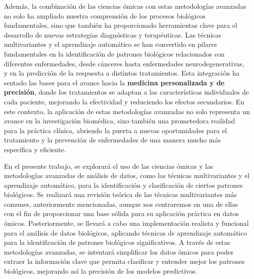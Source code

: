 Además, la combinación de las ciencias ómicas con estas metodologías avanzadas no solo ha ampliado nuestra comprensión
de los procesos biológicos fundamentales, sino que también ha proporcionado herramientas clave para el desarrollo de 
nuevas estrategias diagnósticas y terapéuticas. Las técnicas multivariantes y el aprendizaje 
automático se han convertido en pilares fundamentales en la identificación de patrones biológicos relacionados 
con diferentes enfermedades, desde cánceres hasta enfermedades neurodegenerativas, y en la predicción de la 
respuesta a distintos tratamientos. Esta integración ha sentado las bases para el avance hacia la 
\textbf{medicina personalizada y de precisión}, donde los tratamientos se adaptan a las características 
individuales de cada paciente, mejorando la efectividad y reduciendo los efectos secundarios. En este contexto, 
la aplicación de estas metodologías avanzadas no solo representa un avance en la investigación biomédica, sino 
también una prometedora realidad para la práctica clínica, abriendo la puerta a nuevas oportunidades para el 
tratamiento y la prevención de enfermedades de una manera mucho más específica y eficiente. \newline

En el presente trabajo, se explorará el uso de las ciencias ómicas y las metodologías avanzadas de análisis de 
datos, como las técnicas multivariantes y el aprendizaje automático, para la identificación y clasificación 
de ciertos patrones biológicos. Se realizará una revisión teórica de las técnicas multivariantes más comunes, 
anteriormente mencionadas, aunque nos centraremos en una de ellas con el fin de proporcionar una base sólida 
para su aplicación práctica en datos ómicos. Posteriormente, se llevará a cabo una implementación realista y 
funcional para el análisis de datos biológicos, aplicando técnicas de aprendizaje automático para la identificación 
de patrones biológicos significativos. A través de estas metodologías avanzadas, se intentará simplificar los datos 
ómicos para poder extraer la información clave que permita clasificar y entender mejor los patrones biológicos, 
mejorando así la precisión de los modelos predictivos.

